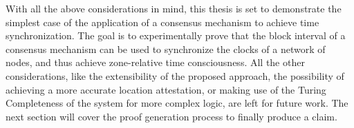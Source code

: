 With all the above considerations in mind, this thesis is set to demonstrate the simplest case of the application of a consensus mechanism to achieve time synchronization. The goal is to experimentally prove that the block interval of a consensus mechanism can be used to synchronize  the clocks of a network of nodes, and thus achieve zone-relative time consciousness. All the other considerations, like the extensibility of the proposed approach, the possibility of achieving a more accurate location attestation, or making use of the Turing Completeness of the system for more complex logic, are left for future work. The next section will cover the proof generation process to finally produce a \pol{} claim.
